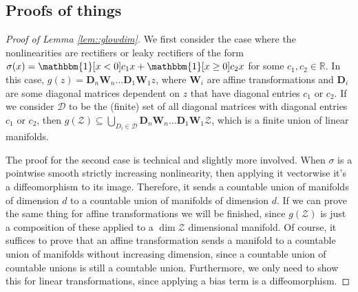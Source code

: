\documentclass{article} %
\newcommand\RR{\mathbb{R}}
\newcommand\Ind{\mathbbm{1}}
\newcommand{\matr}[1]{\mathbf{#1}}
\theoremstyle{definition}
\begin{document}
\clearpage
\begin{appendices}
\section{Proofs of things} \label{app::proofs}
\begin{proof}[Proof of Lemma \autoref{lem::glowdim}]
  We first consider the case where the nonlinearities are rectifiers or leaky
  rectifiers of the form $\sigma(x) = \Ind[x < 0] c_1 x + \Ind[x \geq 0] c_2 x$
  for some $c_1, c_2 \in \RR$.
  In this case, $g(z) = \matr{D}_n \matr{W}_n \dots \matr{D}_1 \matr{W}_1 z$,
  where $\matr{W}_i$ are affine transformations and $\matr{D}_i$ are some
  diagonal matrices dependent on $z$ that have diagonal entries $c_1$ or $c_2$. If
  we consider $\mathcal{D}$ to be the (finite) set of all diagonal matrices with
  diagonal entries $c_1$ or $c_2$, then $g(\mathcal{Z}) \subseteq \bigcup_{D_i \in
  \mathcal{D}} \matr{D}_n \matr{W}_n \dots \matr{D}_1 \matr{W}_1 \mathcal{Z}$,
  which is a finite union of linear manifolds.

  The proof for the second case is technical and slightly more involved. 
  When $\sigma$ is a pointwise smooth strictly increasing nonlinearity, then
  applying it vectorwise it's a diffeomorphism to its image. Therefore,
  it sends a countable union of manifolds of dimension $d$ to a countable
  union of manifolds of dimension $d$. If we can prove the same thing for
  affine transformations we will be finished, since $g(\mathcal{Z})$ 
  is just a composition
  of these applied to a $\dim \mathcal{Z}$ dimensional manifold.
  Of course, it suffices to prove that an affine transformation sends
  a manifold to a countable union of manifolds without increasing dimension,
  since a countable union of countable unions is still a countable union.
  Furthermore, we only need to show this for linear transformations,
  since applying a bias term is a diffeomorphism.


\end{proof}
\end{appendices}
\end{document}
